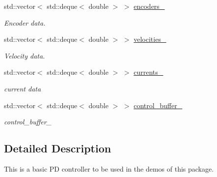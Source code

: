 \begin{DoxyCompactItemize}
\mbox{\label{classblmc__drivers_1_1SineTorqueControl_a501ea19e046c51d747b638f13fafae96}} 
std\+::vector$<$ std\+::deque$<$ double $>$ $>$ \hyperlink{classblmc__drivers_1_1SineTorqueControl_a501ea19e046c51d747b638f13fafae96}{encoders\+\_\+}
\begin{DoxyCompactList}\small\item\em Encoder data. \end{DoxyCompactList}\item 
\mbox{\label{classblmc__drivers_1_1SineTorqueControl_a93eed363c979a64cfe93fb19916c3a75}} 
std\+::vector$<$ std\+::deque$<$ double $>$ $>$ \hyperlink{classblmc__drivers_1_1SineTorqueControl_a93eed363c979a64cfe93fb19916c3a75}{velocities\+\_\+}
\begin{DoxyCompactList}\small\item\em Velocity data. \end{DoxyCompactList}\item 
\mbox{\label{classblmc__drivers_1_1SineTorqueControl_a1519f05faec9972e15f48b3084debbc2}} 
std\+::vector$<$ std\+::deque$<$ double $>$ $>$ \hyperlink{classblmc__drivers_1_1SineTorqueControl_a1519f05faec9972e15f48b3084debbc2}{currents\+\_\+}
\begin{DoxyCompactList}\small\item\em current data \end{DoxyCompactList}\item 
\mbox{\label{classblmc__drivers_1_1SineTorqueControl_a41969250f8847160f590a688bdf1e026}} 
std\+::vector$<$ std\+::deque$<$ double $>$ $>$ \hyperlink{classblmc__drivers_1_1SineTorqueControl_a41969250f8847160f590a688bdf1e026}{control\+\_\+buffer\+\_\+}
\begin{DoxyCompactList}\small\item\em control\+\_\+buffer\+\_\+ \end{DoxyCompactList}\end{DoxyCompactItemize}


\subsection{Detailed Description}
This is a basic PD controller to be used in the demos of this package. 

